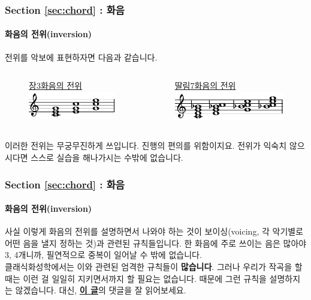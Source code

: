 \documentclass{beamer}
\begin{document}
	\begin{frame}
		\frametitle{Section \ref{sec:chord} : 화음}
		\framesubtitle{화음의 전위(inversion)}
		전위를 악보에 표현하자면 다음과 같습니다.
		\begin{columns}
			\begin{column}{0.4\textwidth}
				\begin{figure}
					\centering
					\color{cyan}\href{run:res/mp3/9/inversion/major_triad.mp3}{장3화음의 전위}
					\includegraphics[width=\textwidth]{res/pdf/9/inversion/triad.pdf}
				\end{figure}
			\end{column}
			\begin{column}{0.4\textwidth}
				\begin{figure}
					\centering
					\color{cyan}\href{run:res/mp3/9/inversion/dominant_7th.mp3}{딸림7화음의 전위}
					\includegraphics[width=\textwidth]{res/pdf/9/inversion/7th.pdf}
				\end{figure}
			\end{column}
		\end{columns}
		\vskip 1.5pc
		이러한 전위는 무궁무진하게 쓰입니다. 진행의 편의를 위함이지요. 전위가 익숙치 않으시다면 스스로 실습을 해나가시는 수밖에 없습니다.
	\end{frame}
	
	\begin{frame}
		\frametitle{Section \ref{sec:chord} : 화음}
		\framesubtitle{화음의 전위(inversion)}
		사실 이렇게 화음의 전위를 설명하면서 나와야 하는 것이 보이싱(voicing, 각 악기별로 어떤 음을 낼지 정하는 것)과 관련된 규칙들입니다. 한 화음에 주로 쓰이는 음은 많아야 3, 4개니까, 필연적으로 중복이 일어날 수 밖에 없습니다.\\
		클래식화성학에서는 이와 관련된 엄격한 규칙들이 {\bf 많습니다}. 그러나 우리가 작곡을 할 때는 이런 걸 일일히 지키면서까지 할 필요는 없습니다. 때문에 그런 규칙을 설명하지는 않겠습니다. 대신, {\bf \color{violet}\href{http://diminished7.net/music_theory/19019}{이 글}}의 댓글을 잘 읽어보세요. 
	\end{frame}
	
\end{document}
